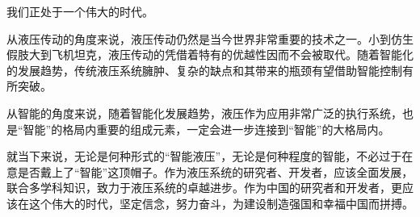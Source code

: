 \begin{summary}

我们正处于一个伟大的时代。

从液压传动的角度来说，液压传动仍然是当今世界非常重要的技术之一。小到仿生假肢大到飞机坦克，液压传动的凭借着特有的优越性因而不会被取代。随着智能化的发展趋势，传统液压系统臃肿、复杂的缺点和其带来的瓶颈有望借助智能控制有所突破。

从智能的角度来说，随着智能化发展趋势，液压作为应用非常广泛的执行系统，也是“智能”的格局内重要的组成元素，一定会进一步连接到“智能”的大格局内。

就当下来说，无论是何种形式的“智能液压”，无论是何种程度的智能，不必过于在意是否戴上了“智能”这顶帽子。作为液压系统的研究者、开发者，应该全面发展，联合多学科知识，致力于液压系统的卓越进步。作为中国的研究者和开发者，更应该在这个伟大的时代，坚定信念，努力奋斗，为建设制造强国和幸福中国而拼搏。

\end{summary}